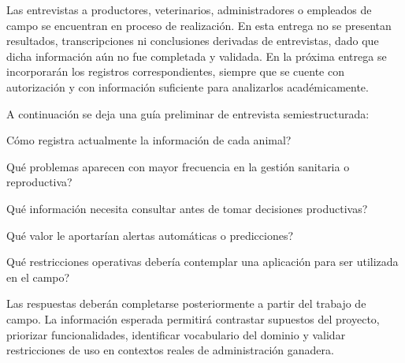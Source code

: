 
Las entrevistas a productores, veterinarios, administradores o empleados de campo se encuentran en proceso de realizaci\'on. En esta entrega no se presentan resultados, transcripciones ni conclusiones derivadas de entrevistas, dado que dicha informaci\'on a\'un no fue completada y validada. En la pr\'oxima entrega se incorporar\'an los registros correspondientes, siempre que se cuente con autorizaci\'on y con informaci\'on suficiente para analizarlos acad\'emicamente.

A continuaci\'on se deja una gu\'ia preliminar de entrevista semiestructurada:

\begin{description}[leftmargin=0cm, labelsep=0.5cm]
    \item[\textbf{Pregunta 1:}] \textquestiondown C\'omo registra actualmente la informaci\'on de cada animal?
    \item[\textbf{Pregunta 2:}] \textquestiondown Qu\'e problemas aparecen con mayor frecuencia en la gesti\'on sanitaria o reproductiva?
    \item[\textbf{Pregunta 3:}] \textquestiondown Qu\'e informaci\'on necesita consultar antes de tomar decisiones productivas?
    \item[\textbf{Pregunta 4:}] \textquestiondown Qu\'e valor le aportar\'ian alertas autom\'aticas o predicciones?
    \item[\textbf{Pregunta 5:}] \textquestiondown Qu\'e restricciones operativas deber\'ia contemplar una aplicaci\'on para ser utilizada en el campo?
\end{description}

Las respuestas deber\'an completarse posteriormente a partir del trabajo de campo. La informaci\'on esperada permitir\'a contrastar supuestos del proyecto, priorizar funcionalidades, identificar vocabulario del dominio y validar restricciones de uso en contextos reales de administraci\'on ganadera.
